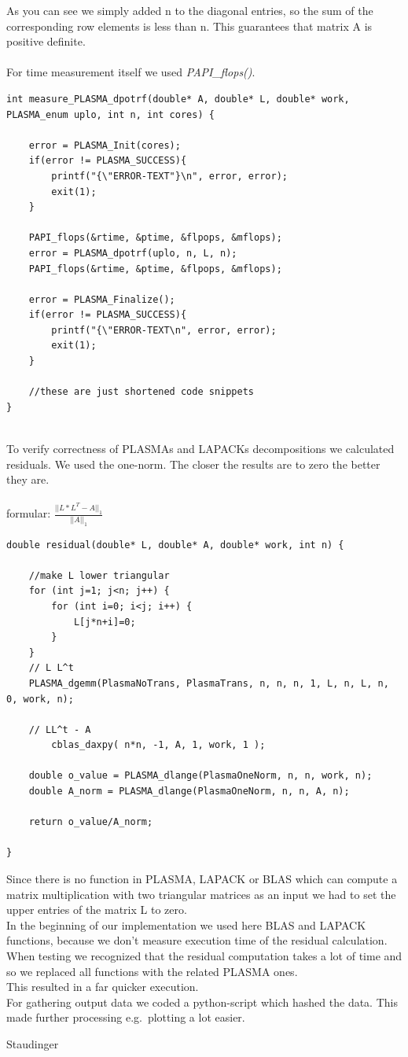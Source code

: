 \documentclass[a4paper,final,ngerman,english]{article}
\begin{document}
As you can see we simply added n to the diagonal entries, so the sum of the corresponding row elements is less than n. This guarantees that matrix A is positive definite.\\
\ \\
For time measurement itself we used \textit{PAPI\_flops()}.
\begin{lstlisting}
int measure_PLASMA_dpotrf(double* A, double* L, double* work, PLASMA_enum uplo, int n, int cores) {

	error = PLASMA_Init(cores);
	if(error != PLASMA_SUCCESS){
		printf("{\"ERROR-TEXT"}\n", error, error);
		exit(1);
	}

	PAPI_flops(&rtime, &ptime, &flpops, &mflops);
	error = PLASMA_dpotrf(uplo, n, L, n);
	PAPI_flops(&rtime, &ptime, &flpops, &mflops);

	error = PLASMA_Finalize();
	if(error != PLASMA_SUCCESS){
		printf("{\"ERROR-TEXT\n", error, error);
		exit(1);
	}
	
	//these are just shortened code snippets
}
\end{lstlisting}
\ \\
To verify correctness of PLASMAs and LAPACKs decompositions we calculated residuals.
We used the one-norm. The closer the results are to zero the better they are.\\
\ \\
formular:
\(\frac{||L*L^T-A||_1}{||A||_1}\)\\


\begin{lstlisting}
double residual(double* L, double* A, double* work, int n) {

	//make L lower triangular
	for (int j=1; j<n; j++) {
		for (int i=0; i<j; i++) {
			L[j*n+i]=0;
		}
	}
	// L L^t
	PLASMA_dgemm(PlasmaNoTrans, PlasmaTrans, n, n, n, 1, L, n, L, n, 0, work, n);

	// LL^t - A
    	cblas_daxpy( n*n, -1, A, 1, work, 1 );

	double o_value = PLASMA_dlange(PlasmaOneNorm, n, n, work, n);
	double A_norm = PLASMA_dlange(PlasmaOneNorm, n, n, A, n);

	return o_value/A_norm;

}
\end{lstlisting}
Since there is no function in PLASMA, LAPACK or BLAS which can compute a matrix multiplication with two triangular matrices as an input we had to set the upper entries of the matrix L to zero.\\
In the beginning of our implementation we used here BLAS and LAPACK functions, because we don't measure execution time of the residual calculation. When testing we recognized that the residual computation takes a lot of time and so we replaced all functions with the related PLASMA ones.\\
This resulted in a far quicker execution.
\ \\
For gathering output data we coded a python-script which hashed the data. This made further processing e.g.\ plotting a lot easier.
\begin{flushright} Staudinger \end{flushright}
\end{document}
